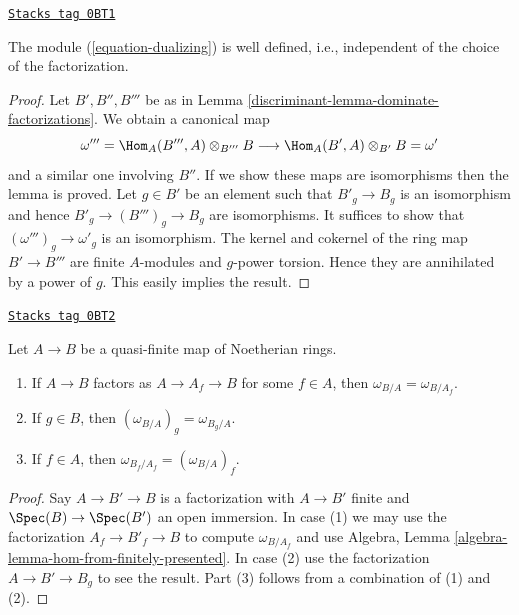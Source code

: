 \begin{lemma}
\label{discriminant-lemma-dualizing-well-defined}
\href{https://stacks.math.columbia.edu/tag/0BT1}{\texttt{Stacks tag 0BT1}}

The module (\ref{equation-dualizing}) is well defined, i.e.,
independent of the choice of the factorization.
\end{lemma}

\begin{proof}

Let $B', B'', B'''$ be as in Lemma \ref{discriminant-lemma-dominate-factorizations}.
We obtain a canonical map
$$
\omega''' = \Hom_A(B''', A) \otimes_{B'''} B \longrightarrow
\Hom_A(B', A) \otimes_{B'} B = \omega'
$$
and a similar one involving $B''$. If we show these maps are isomorphisms
then the lemma is proved. Let $g \in B'$ be an element such that
$B'_g \to B_g$ is an isomorphism and hence $B'_g \to (B''')_g \to B_g$
are isomorphisms. It suffices to show that $(\omega''')_g \to \omega'_g$
is an isomorphism. The kernel and cokernel of the ring map $B' \to B'''$
are finite $A$-modules and $g$-power torsion.
Hence they are annihilated by a power of $g$.
This easily implies the result.
\end{proof}

\begin{lemma}
\label{discriminant-lemma-localize-dualizing}
\href{https://stacks.math.columbia.edu/tag/0BT2}{\texttt{Stacks tag 0BT2}}

Let $A \to B$ be a quasi-finite map of Noetherian rings.
\begin{enumerate}
\item If $A \to B$ factors as $A \to A_f \to B$ for some $f \in A$,
then $\omega_{B/A} = \omega_{B/A_f}$.
\item If $g \in B$, then $(\omega_{B/A})_g = \omega_{B_g/A}$.
\item If $f \in A$, then $\omega_{B_f/A_f} = (\omega_{B/A})_f$.
\end{enumerate}
\end{lemma}

\begin{proof}
Say $A \to B' \to B$ is a factorization with $A \to B'$ finite and
$\Spec(B) \to \Spec(B')$ an open immersion. In case (1) we may use
the factorization $A_f \to B'_f \to B$ to compute $\omega_{B/A_f}$
and use Algebra, Lemma \ref{algebra-lemma-hom-from-finitely-presented}.
In case (2) use the factorization $A \to B' \to B_g$ to see the result.
Part (3) follows from a combination of (1) and (2).
\end{proof}

